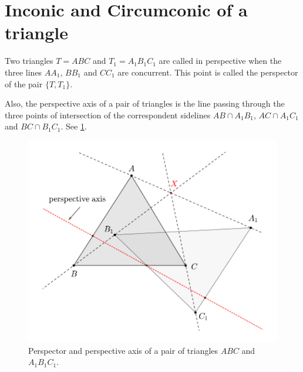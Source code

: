 
\section{Inconic and Circumconic of a triangle}
\label{app:A-inconic}

Two triangles $T=ABC$ and $T_1=A_1B_1C_1$ are called in perspective when  the three lines $AA_1$, $BB_1$ and $CC_1$ are concurrent. This point is called the perspector of the pair $\{T,T_1\}$.

Also, the perspective axis of a pair of triangles is the line passing through the   three points of intersection of the correspondent sidelines $AB\cap A_1B_1$,
$AC\cap A_1C_1$ and $BC\cap B_1C_1$.
See \cref{fig:appA-perspector}.
\begin{figure}
    \centering
    \includegraphics[scale=0.4]{zappA/pics/pics-appA-101-perspector.pdf}
    \caption{Perspector and perspective axis of a pair of triangles $ABC$ and $A_1B_1C_1$.}
    \label{fig:appA-perspector}
\end{figure}

